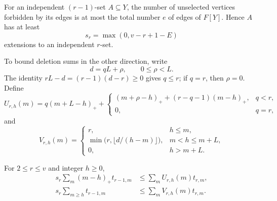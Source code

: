 For an independent $(r-1)$-set $A\subseteq Y$, the number of unselected
vertices forbidden by its edges is at most the total number $e$ of edges
of $F[Y]$.  Hence $A$ has at least
\begin{equation}
 s_r=\max(0,v-r+1-E)
 \label{f60:eq-extension-lower}
\end{equation}
extensions to an independent $r$-set.

To bound deletion sums in the other direction, write
\[
 d=qL+\rho,\qquad 0\le\rho<L.
\]
The identity
$rL-d=(r-1)(d-r)\ge0$ gives $q\le r$; if $q=r$, then $\rho=0$.
Define
\begin{equation}
 U_{r,h}(m)=q(m+L-h)_+
 +\begin{cases}
 (m+\rho-h)_++(r-q-1)(m-h)_+,&q<r,\\
 0,&q=r,
 \end{cases}
 \label{f60:eq-U}
\end{equation}
and
\begin{equation}
 V_{r,h}(m)=
 \begin{cases}
 r,&h\le m,\\
 \min\bigl(r,\lfloor d/(h-m)\rfloor\bigr),&m<h\le m+L,\\
 0,&h>m+L.
 \end{cases}
 \label{f60:eq-V}
\end{equation}

\begin{lemma}
\label{f60:lem-release-upper}
For $2\le r\le v$ and integer $h\ge0$,
\begin{align}
 s_r\sum_m(m-h)_+t_{r-1,m}
 &\le\sum_m U_{r,h}(m)t_{r,m},
 \label{f60:eq-release-upper}\\
 s_r\sum_{m\ge h}t_{r-1,m}
 &\le\sum_m V_{r,h}(m)t_{r,m}.
 \label{f60:eq-tail-upper}
\end{align}
\end{lemma}

